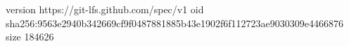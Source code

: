 version https://git-lfs.github.com/spec/v1
oid sha256:9563e2940b342669cf9f0487881885b43e1902f6f112723ae9030309e4466876
size 184626
